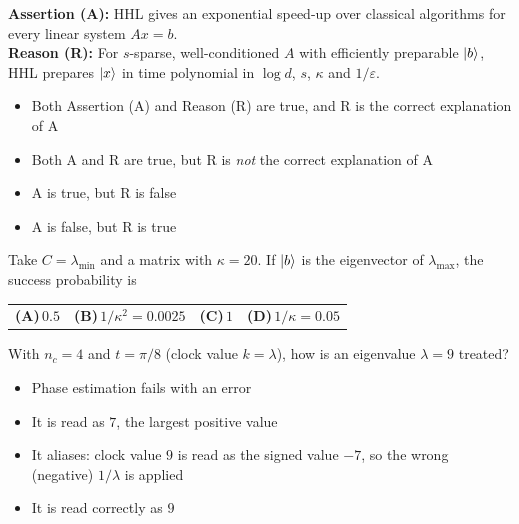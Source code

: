 \documentclass[11pt,a4paper]{article}
\newcommand{\optlabel}[1]{\textbf{(#1)}}
\newenvironment{qitem}[1]{\begin{list}{}{\setlength{\leftmargin}{3.3em}\setlength{\labelwidth}{3.1em}%
  \setlength{\labelsep}{0.2em}\setlength{\topsep}{3pt}\setlength{\parsep}{3pt}}\item[\textbf{Q.#1}\hfill]}{\end{list}}
\newcommand{\qsep}{\par\vspace{2pt}{\color{black!15}\hrule}\vspace{4pt}}
\begin{document}
\begin{qitem}{69}
\textbf{Assertion (A):} HHL gives an exponential speed-up over classical algorithms for every linear system $Ax = b$.\\[1mm]
\textbf{Reason (R):} For $s$-sparse, well-conditioned $A$ with efficiently preparable $\ket b$, HHL prepares $\ket x$ in time polynomial in $\log d$, $s$, $\kappa$ and $1/\varepsilon$.
\begin{itemize}[leftmargin=2.6em, labelsep=0.4em, itemsep=2pt, topsep=3pt]
\item[\optlabel{A}] Both Assertion (A) and Reason (R) are true, and R is the correct explanation of A
\item[\optlabel{B}] Both A and R are true, but R is \emph{not} the correct explanation of A
\item[\optlabel{C}] A is true, but R is false
\item[\optlabel{D}] A is false, but R is true
\end{itemize}
\end{qitem}
\qsep

\begin{qitem}{70}
Take $C = \lambda_{\min}$ and a matrix with $\kappa = 20$. If $\ket b$ is the eigenvector of $\lambda_{\max}$, the success probability is
\par\smallskip\noindent\begin{tabularx}{\linewidth}{@{}*{4}{L}@{}}
\optlabel{A}\,$0.5$ & \optlabel{B}\,$1/\kappa^2 = 0.0025$ & \optlabel{C}\,$1$ & \optlabel{D}\,$1/\kappa = 0.05$
\end{tabularx}
\end{qitem}
\qsep

\begin{qitem}{71}
With $n_c = 4$ and $t = \pi/8$ (clock value $k = \lambda$), how is an eigenvalue $\lambda = 9$ treated?
\begin{itemize}[leftmargin=2.6em, labelsep=0.4em, itemsep=2pt, topsep=3pt]
\item[\optlabel{A}] Phase estimation fails with an error
\item[\optlabel{B}] It is read as $7$, the largest positive value
\item[\optlabel{C}] It aliases: clock value $9$ is read as the signed value $-7$, so the wrong (negative) $1/\lambda$ is applied
\item[\optlabel{D}] It is read correctly as $9$
\end{itemize}
\end{qitem}
\qsep
\end{document}
